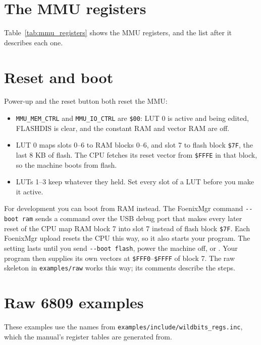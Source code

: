 \section{The MMU registers}

Table~\ref{tab:mmu_registers} shows the MMU registers, and the list after it describes each one.




\section{Reset and boot}
\label{pg:mmu_boot_config}

Power-up and the reset button both reset the MMU:

\begin{itemize}
    \item \verb+MMU_MEM_CTRL+ and \verb+MMU_IO_CTRL+ are \verb+$00+: LUT 0 is active and being edited, FLASHDIS is clear, and the constant RAM and vector RAM are off.
    \item LUT 0 maps slots 0--6 to RAM blocks 0--6, and slot 7 to flash block \verb+$7F+, the last 8 KB of flash. The CPU fetches its reset vector from \verb+$FFFE+ in that block, so the machine boots from flash.
    \item LUTs 1--3 keep whatever they held. Set every slot of a LUT before you make it active.
\end{itemize}

For development you can boot from RAM instead. The FoenixMgr command \verb+--boot ram+ sends a command over the USB debug port that makes every later reset of the CPU map RAM block 7 into slot 7 instead of flash block \verb+$7F+. Each FoenixMgr upload resets the CPU this way, so it also starts your program. The setting lasts until you send \verb+--boot flash+, power the machine off, or . Your program then supplies its own vectors at \verb+$FFF0+--\verb+$FFFF+ of block 7. The raw skeleton in \verb+examples/raw+ works this way; its comments describe the steps.

\section{Raw 6809 examples}

These examples use the names from \verb+examples/include/wildbits_regs.inc+, which the manual's register tables are generated from.


